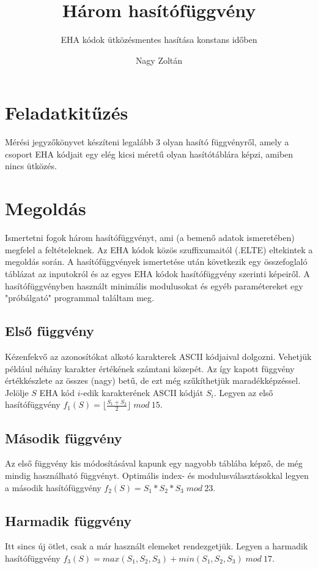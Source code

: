 \documentclass{scrartcl}
\author{Nagy Zoltán}
\title{Három hasítófüggvény}
\subtitle{EHA kódok ütközésmentes hasítása konstans időben}
\begin{document}
\maketitle
\pagebreak

\section{Feladatkitűzés}
Mérési jegyzőkönyvet készíteni legalább 3 olyan hasító függvényről, amely a csoport EHA kódjait egy elég kicsi méretű olyan hasítótáblára képzi, amiben nincs ütközés.

\section{Megoldás}
Ismertetni fogok három hasítófüggvényt, ami (a bemenő adatok ismeretében) megfelel a feltételeknek. Az EHA kódok közös szuffixumaitól (\textsf{.ELTE}) eltekintek a megoldás során. A hasító\-függvények ismertetése után következik egy összefoglaló táblázat az inputokról és az egyes EHA kódok hasítófüggvény szerinti képeiről. A hasító\-függvényben használt minimális modulusokat és egyéb paramétereket egy "próbálgató" programmal találtam meg.

\subsection{Első függvény}
Kézenfekvő az azonosítókat alkotó karakterek ASCII kódjaival dolgozni. Vehetjük pél\-dá\-ul néhány karakter értékének számtani közepét. Az így kapott függvény érték\-készlete az összes (nagy) betű, de ezt még szűkíthetjük maradékképzéssel. Jelölje $S$ EHA kód $i$-edik karakterének ASCII kódját $S_i$. Legyen az első hasítófüggvény $f_1(S) = \lfloor\frac{S_1 + S_2}{2}\rfloor \;mod \:15$.

\subsection{Második függvény}
Az első függvény kis módosításával kapunk egy nagyobb táblába képző, de még mindig használható függvényt. Optimális index- és modulusválasztásokkal legyen a második hasítófüggvény $f_2(S) = S_1 * S_2 * S_3 \;mod \:23$.

\subsection{Harmadik függvény}
Itt sincs új ötlet, csak a már használt elemeket rendezgetjük. Legyen a harmadik hasítófüggvény $f_3(S) = max(S_1, S_2, S_3) + min(S_1, S_2, S_3) \;mod \:17$.
\end{document}

